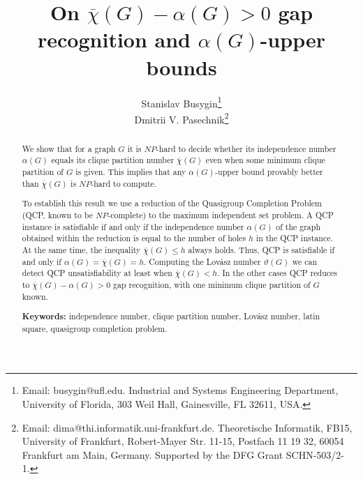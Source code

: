 \documentclass[11pt]{article}
\begin{document}
\title{On $\overline{\chi}(G)-\alpha(G)>0$ gap recognition and
$\alpha(G)$-upper bounds}

\author{
Stanislav Busygin\thanks{Email: busygin@ufl.edu. Industrial and Systems 
Engineering Department, University of Florida, 303 Weil Hall, Gainesville, FL 
32611, USA.} \\
Dmitrii V. Pasechnik\thanks{Email: dima@thi.informatik.uni-frankfurt.de. 
Theoretische Informatik, FB15, University of Frankfurt, Robert-Mayer Str. 11-15, 
Postfach 11 19 32, 60054 Frankfurt am Main, Germany. Supported by the DFG Grant 
{\sf SCHN-503/2-1}.}}

\date{}

\maketitle

\begin{abstract}
We show that for a graph $G$ it is $NP$-hard to decide whether
its independence number $\alpha(G)$ equals its clique partition number
$\overline{\chi}(G)$ even when some minimum clique partition of $G$ is
given. This implies that any $\alpha(G)$-upper bound provably better than
$\overline{\chi}(G)$ is $NP$-hard to compute.

To establish this result we use a reduction of the Quasigroup Completion
Problem (QCP, known to be $NP$-complete) to the maximum independent set
problem. A QCP instance is satisfiable if and only if the independence number
$\alpha(G)$ of the graph obtained within the reduction is equal to the number
of holes $h$ in the QCP instance. At the same time, the inequality
$\overline{\chi}(G) \le h$ always holds. Thus, QCP is satisfiable if and
only if $\alpha(G)=\overline{\chi}(G)=h$. Computing the Lov\'asz number
$\vartheta(G)$ we can detect QCP unsatisfiability at least when
$\overline{\chi}(G)<h$. In the other cases QCP reduces to
$\overline{\chi}(G)-\alpha(G)>0$ gap recognition, with one minimum clique 
partition of $G$ known.

{\bf Keywords:} independence number, clique partition number, Lov\'asz number, 
latin square, quasigroup completion problem.
\end{abstract}
\end{document}
